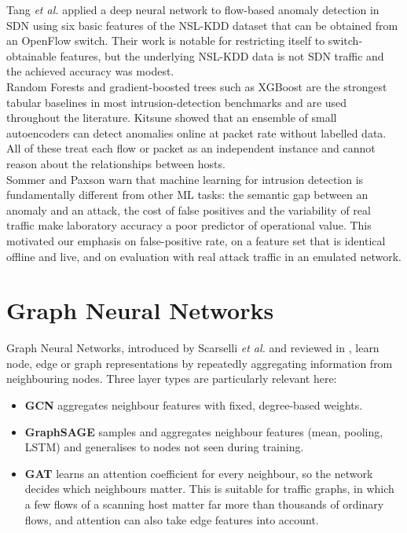 Tang \emph{et al.} \cite{bib:tang} applied a deep neural network to flow-based anomaly detection in SDN using six basic features of the NSL-KDD dataset that can be obtained from an OpenFlow switch. Their work is notable for restricting itself to switch-obtainable features, but the underlying NSL-KDD data is not SDN traffic and the achieved accuracy was modest.\\

Random Forests \cite{bib:rf} and gradient-boosted trees such as XGBoost \cite{bib:xgb} are the strongest tabular baselines in most intrusion-detection benchmarks and are used throughout the literature. Kitsune \cite{bib:kitsune} showed that an ensemble of small autoencoders can detect anomalies online at packet rate without labelled data. All of these treat each flow or packet as an independent instance and cannot reason about the relationships between hosts.\\

Sommer and Paxson \cite{bib:sommer} warn that machine learning for intrusion detection is fundamentally different from other ML tasks: the semantic gap between an anomaly and an attack, the cost of false positives and the variability of real traffic make laboratory accuracy a poor predictor of operational value. This motivated our emphasis on false-positive rate, on a feature set that is identical offline and live, and on evaluation with real attack traffic in an emulated network.

\section{Graph Neural Networks}

Graph Neural Networks, introduced by Scarselli \emph{et al.} \cite{bib:scarselli} and reviewed in \cite{bib:gnnreview}, learn node, edge or graph representations by repeatedly aggregating information from neighbouring nodes. Three layer types are particularly relevant here:

\begin{itemize}
	\item \textbf{GCN} \cite{bib:gcn} aggregates neighbour features with fixed, degree-based weights.
	\item \textbf{GraphSAGE} \cite{bib:sage} samples and aggregates neighbour features (mean, pooling, LSTM) and generalises to nodes not seen during training.
	\item \textbf{GAT} \cite{bib:gat} learns an attention coefficient for every neighbour, so the network decides which neighbours matter. This is suitable for traffic graphs, in which a few flows of a scanning host matter far more than thousands of ordinary flows, and attention can also take edge features into account.
\end{itemize}


